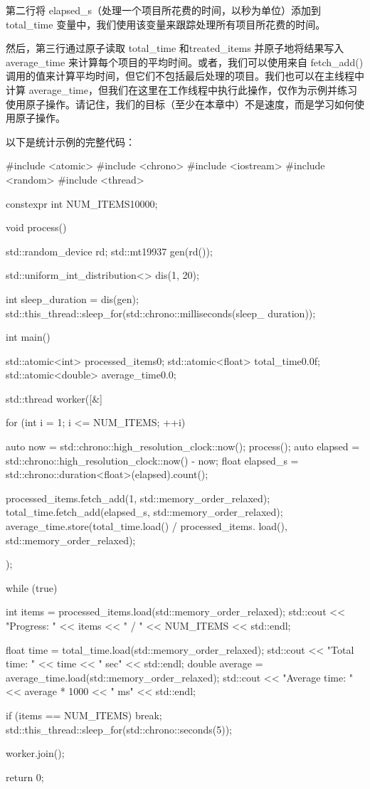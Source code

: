 第二行将 elapsed\_s（处理一个项目所花费的时间，以秒为单位）添加到 total\_time 变量中，我们使用该变量来跟踪处理所有项目所花费的时间。

然后，第三行通过原子读取 total\_time 和treated\_items 并原子地将结果写入 average\_time 来计算每个项目的平均时间。或者，我们可以使用来自 fetch\_add() 调用的值来计算平均时间，但它们不包括最后处理的项目。我们也可以在主线程中计算 average\_time，但我们在这里在工作线程中执行此操作，仅作为示例并练习使用原子操作。请记住，我们的目标（至少在本章中）不是速度，而是学习如何使用原子操作。

以下是统计示例的完整代码：

\begin{cpp}
#include <atomic>
#include <chrono>
#include <iostream>
#include <random>
#include <thread>

constexpr int NUM_ITEMS{10000};

void process() {
    std::random_device rd;
    std::mt19937 gen(rd());

    std::uniform_int_distribution<> dis(1, 20);

    int sleep_duration = dis(gen);
        std::this_thread::sleep_for(std::chrono::milliseconds(sleep_
    duration));
}

int main() {
    std::atomic<int> processed_items{0};
    std::atomic<float> total_time{0.0f};
    std::atomic<double> average_time{0.0};

    std::thread worker([&] {
        for (int i = 1; i <= NUM_ITEMS; ++i) {
            auto now = std::chrono::high_resolution_clock::now();
            process();
            auto elapsed =
                std::chrono::high_resolution_clock::now() - now;
            float elapsed_s =
                std::chrono::duration<float>(elapsed).count();

            processed_items.fetch_add(1, std::memory_order_relaxed);
            total_time.fetch_add(elapsed_s, std::memory_order_relaxed);
            average_time.store(total_time.load() / processed_items.
            load(), std::memory_order_relaxed);
        }
    });

    while (true) {
        int items = processed_items.load(std::memory_order_relaxed);
        std::cout << "Progress: " << items << " / " << NUM_ITEMS <<
        std::endl;

        float time = total_time.load(std::memory_order_relaxed);
        std::cout << "Total time: " << time << " sec" << std::endl;
        double average = average_time.load(std::memory_order_relaxed);
        std::cout << "Average time: " << average * 1000 << " ms" << std::endl;

        if (items == NUM_ITEMS) {
            break;
        }
        std::this_thread::sleep_for(std::chrono::seconds(5));
    }
    worker.join();

    return 0;
}
\end{cpp}

